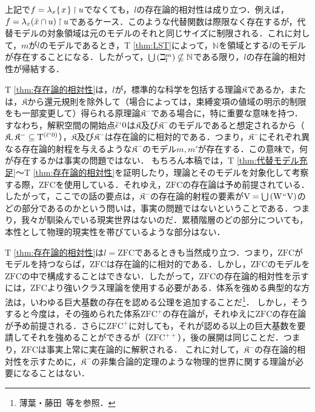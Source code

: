 \noindent 上記で$f = \lambda_x\{\mspace{2mu}x\mspace{2mu}\}\mathbin{\upharpoonright} u$でなくても，$l$の存在論的相対性は成り立つ．例えば，$ f = \lambda_x(\bar{x}\cap u)\mathbin{\upharpoonright} u $であるケース．このような代替関数は際限なく存在するが，代替モデルの対象領域は元のモデルのそれと同じサイズに制限される．これに対して，$m$が$l$のモデルであるとき，T \ref{thm:LST}によって，$\mathbb{N}$を領域とする$l$のモデルが存在することになる．したがって，${\textstyle\bigcup}\mspace{3mu}(\beth^m_l)\nsubseteq\mathbb{N}$である限り，$l$の存在論的相対性が帰結する．

T \ref{thm:存在論的相対性}は，$l$が，標準的な科学を包括する理論$\mathfrak{K}$であるか，または，$\mathfrak{K}$から還元規則を除外して（場合によっては，束縛変項の値域の明示的制限をも一部変更して）得られる原理論$\mathfrak{K}^{-}$である場合に，特に重要な意味を持つ．
すなわち，解釈空間の開始点$\breve{\epsilon}{\mspace{1mu}{`}\mspace{1mu}} 0 $は$\mathfrak{K}$及び$\mathfrak{K}^{-}$のモデルであると想定されるから（$\mathfrak{K},\mathfrak{K}^{-}\subseteq\mathrm{T}^{(\breve{\epsilon}{\mspace{1mu}{`}\mspace{1mu}} 0)}$），$\mathfrak{K}$及び$\mathfrak{K}^{-}$は存在論的に相対的である．つまり，$\mathfrak{K}^{-}$にそれぞれ異なる存在論的射程を与えるような$\mathfrak{K}^{-}$のモデル$m,m'$が存在する．この意味で，何が存在するかは事実の問題ではない．
もちろん本稿では，T \ref{thm:代替モデル充足}〜T \ref{thm:存在論的相対性}を証明したり，理論とそのモデルを対象化して考察する際，$\mathrm{ZFC}$を使用している．それゆえ，$\mathrm{ZFC}$の存在論は予め前提されている．したがって，ここでの話の要点は，$\mathfrak{K}^{-}$の存在論的射程の要素が$\mathrm{V} = {\textstyle\bigcup}\mspace{3mu}(\mathrm{W}{\mspace{1mu}{``}\mspace{1mu}}\mathrm{V})$のどの部分であるのかという問いは，事実の問題ではないということである．つまり，我々が馴染んでいる現実世界はないのだ．累積階層のどの部分についても，本性として物理的現実性を帯びているような部分はない．

T \ref{thm:存在論的相対性}は$l=\mathrm{ZFC}$であるときも当然成り立つ．つまり，$\mathrm{ZFC}$がモデルを持つならば，$\mathrm{ZFC}$は存在論的に相対的である．しかし，$\mathrm{ZFC}$のモデルを$\mathrm{ZFC}$の中で構成することはできない．したがって，$\mathrm{ZFC}$の存在論的相対性を示すには，$\mathrm{ZFC}$より強いクラス理論を使用する必要がある．体系を強める典型的な方法は，いわゆる巨大基数の存在を認める公理を追加することだ\footnote{
    薄葉・藤田~\cite{薄葉}等を参照．
}．
しかし，そうすると今度は，その強められた体系$\mathrm{ZFC}^{+}$の存在論が，それゆえに$\mathrm{ZFC}$の存在論が予め前提される．さらに$\mathrm{ZFC}^{+}$に対しても，それが認める以上の巨大基数を要請してそれを強めることができるが（$\mathrm{ZFC}^{++}$），後の展開は同じことだ．つまり，$\mathrm{ZFC}$は事実上常に実在論的に解釈される．
これに対して，$\mathfrak{K}^{-}$の存在論的相対性を示すために，$\mathfrak{K}^{-}$の非集合論的定理のような物理的世界に関する理論が必要になることはない．

